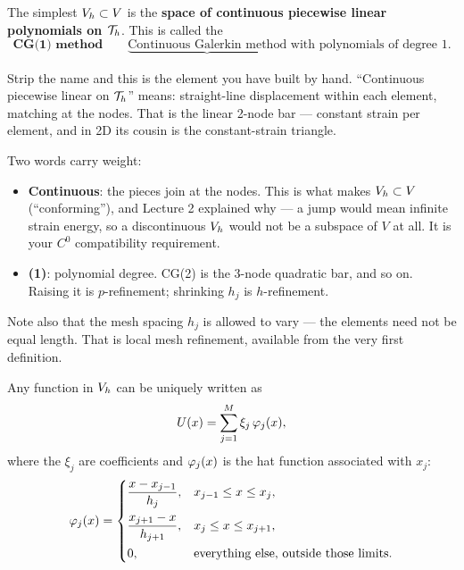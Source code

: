 \medskip
The simplest $V_{h}\subset V$ is the \textbf{space of continuous piecewise linear
polynomials on $\mathcal{T}_{h}$}. This is called the
\begin{equation}
  \boxed{\textbf{CG(1) method}}
  \qquad
  \underbrace{\text{Continuous Galerkin method}}_{}
  \text{ with polynomials of degree } 1 .
\end{equation}

\begin{mechanics}
Strip the name and this is the element you have built by hand. ``Continuous
piecewise linear on $\mathcal{T}_{h}$'' means: straight-line displacement within each
element, matching at the nodes. That is the linear 2-node bar --- constant
strain per element, and in 2D its cousin is the constant-strain triangle.

Two words carry weight:
\begin{itemize}[leftmargin=1.4em,itemsep=2pt]
  \item \textbf{Continuous}: the pieces join at the nodes. This is what makes
        $V_{h}\subset V$ (``conforming''), and Lecture 2 explained why --- a jump
        would mean infinite strain energy, so a discontinuous $V_{h}$ would not
        be a subspace of $V$ at all. It is your $C^{0}$ compatibility
        requirement.
  \item \textbf{(1)}: polynomial degree. CG(2) is the 3-node quadratic bar,
        and so on. Raising it is $p$-refinement; shrinking $h_{j}$ is
        $h$-refinement.
\end{itemize}
Note also that the mesh spacing $h_j$ is allowed to vary --- the elements need
not be equal length. That is local mesh refinement, available from the very
first definition.
\end{mechanics}

\medskip
Any function in $V_{h}$ can be uniquely written as
\begin{equation}\label{eq:expansion}
  U(x) = \sum_{j=1}^{M} \xi_{j}\,\varphi_{j}(x),
\end{equation}
where the $\xi_{j}$ are coefficients and $\varphi_{j}(x)$ is the hat function
associated with $x_{j}$:
\begin{equation}\label{eq:hat}
  \varphi_{j}(x) = \begin{cases}
    \dfrac{x-x_{j-1}}{h_{j}}, & x_{j-1}\le x\le x_{j},\\[10pt]
    \dfrac{x_{j+1}-x}{h_{j+1}}, & x_{j}\le x\le x_{j+1},\\[8pt]
    0, & \text{everything else, outside those limits.}
  \end{cases}
\end{equation}

